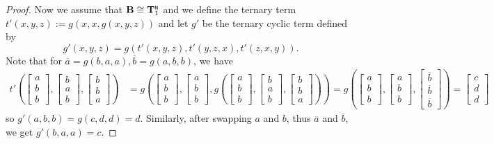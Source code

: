 \documentclass[11pt]{amsart}
\newcommand{\m}[1]{\mathbf{\uppercase{#1}}}
\newcommand{\n}{\scriptscriptstyle{\mathsf{N}}}
\theoremstyle{definition}
\theoremstyle{remark}
\theoremstyle{plain}
\def\T{\mathbf{T}}
\begin{document}
\begin{proof}
Now we assume that $\m b\cong {\T}_1^{\n}$ and we define the ternary term $t'(x,y,z):=g(x,x,g(x,y,z))$ and let $g'$ be the ternary cyclic term defined by $$g'(x,y,z)=g(t'(x,y,z),t'(y,z,x),t'(z,x,y)).$$
Note that for $\overline{a}=g(b,a,a), \overline{b}=g(a,b,b)$, we have
\begin{align*}
t'\left(
\begin{bmatrix}
a \\
b \\
b
\end{bmatrix}\!,\!
\begin{bmatrix}
b \\
a \\
b
\end{bmatrix}\!,\!
\begin{bmatrix}
b \\
b \\
a
\end{bmatrix}
\right)& =g\left(
\begin{bmatrix}
a \\
b \\
b
\end{bmatrix}\!,\! 
\begin{bmatrix}
a \\
b \\
b
\end{bmatrix}\!,
g\left(
\begin{bmatrix}
a \\
b \\
b
\end{bmatrix}\!,\!
\begin{bmatrix}
b \\
a \\
b
\end{bmatrix}\!,\!
\begin{bmatrix}
b \\
b \\
a
\end{bmatrix}
\right)
\right)=g\left(
\begin{bmatrix}
a \\
b \\
b
\end{bmatrix}\!,\!
\begin{bmatrix}
a \\
b \\
b
\end{bmatrix}\!,\!
\begin{bmatrix}
\overline{b} \\
\overline{b} \\
\overline{b}
\end{bmatrix}
\right)
=
\begin{bmatrix}
c \\
d \\
d
\end{bmatrix}
\end{align*}
so $g'(a,b,b)=g(c,d,d)=d$. Similarly, after swapping $a$ and $b$, thus $\overline{a}$ and $\overline{b}$, we get $g'(b,a,a)=c$.


\end{proof}
\end{document}
